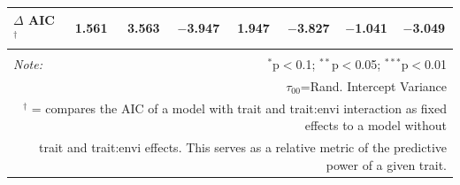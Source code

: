 \documentclass[12pt, letterpaper]{article}
\begin{document}
\begin{table}[h]
{\begin{tabular}{lccccccc}
\hline 
\rowcolor[gray]{.95}$\Delta$ AIC$^\dagger$  & 1.561 & 3.563 & $-$3.947 & 1.947 & $-$3.827 & $-$1.041 & $-$3.049 \\
\hline 
\hline \\[-1.8ex] 
\textit{Note:}  & \multicolumn{7}{r}{$^{*}$p$<$0.1; $^{**}$p$<$0.05; $^{***}$p$<$0.01} \\ 
\multicolumn{8}{r}{$\tau_{00}$=Rand. Intercept Variance}\\ 
\multicolumn{8}{r}{$^\dagger$ = compares the AIC of a model with trait and trait:envi interaction as fixed effects to a model without}\\
\multicolumn{8}{r}{trait and trait:envi effects. This serves as a relative metric of the predictive power of a given trait.}
\end{tabular} }
\end{table} 
\end{document}
